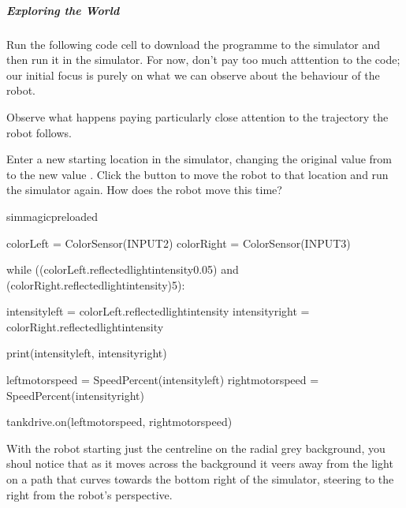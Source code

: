 \documentclass[letterpaper,10pt,english]{sphinxmanual}
\begin{document}
\subparagraph{Exploring the  World}
\label{\detokenize{content/03_Robot_Lab/Section_00_03:Exploring-the-Radial-Grey-World}}
Run the following code cell to download the programme to the simulator and then run it in the simulator. For now, don’t pay too much atttention to the code; our initial focus is purely on what we can observe about the behaviour of the robot.

Observe what happens paying particularly close attention to the trajectory the robot follows.

Enter a new starting location in the simulator, changing the original  value from  to the new value . Click the  button to move the robot to that location and run the simulator again. How does the robot move this time?

{
\begin{sphinxVerbatim}[commandchars=\\\{\}]
\llap{\color{nbsphinxin}[ ]:\,\hspace{\fboxrule}\hspace{\fboxsep}}\PYGZpc{}\PYGZpc{}sim\PYGZus{}magic\PYGZus{}preloaded

colorLeft = ColorSensor(INPUT\PYGZus{}2)
colorRight = ColorSensor(INPUT\PYGZus{}3)

while ((colorLeft.reflected\PYGZus{}light\PYGZus{}intensity\PYGZgt{}0.05)
       and (colorRight.reflected\PYGZus{}light\PYGZus{}intensity)\PYGZgt{}5):

    intensity\PYGZus{}left = colorLeft.reflected\PYGZus{}light\PYGZus{}intensity
    intensity\PYGZus{}right = colorRight.reflected\PYGZus{}light\PYGZus{}intensity

    print(intensity\PYGZus{}left, intensity\PYGZus{}right)

    left\PYGZus{}motor\PYGZus{}speed = SpeedPercent(intensity\PYGZus{}left)
    right\PYGZus{}motor\PYGZus{}speed = SpeedPercent(intensity\PYGZus{}right)

    tank\PYGZus{}drive.on(left\PYGZus{}motor\PYGZus{}speed, right\PYGZus{}motor\PYGZus{}speed)
\end{sphinxVerbatim}
}

With the robot starting just  the centreline on the radial grey background, you shoul notice that as it moves across the background it veers away from the light on a path that curves towards the bottom right of the simulator, steering to the right from the robot’s perspective.
\end{document}
